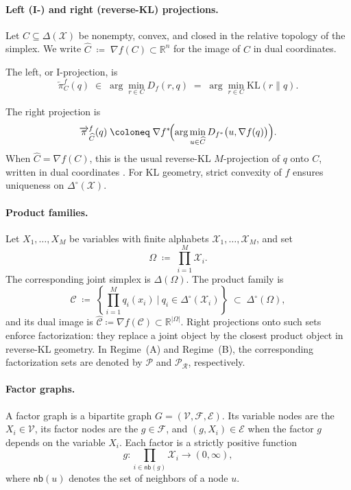 \documentclass[12pt]{article}
\newcommand{\1}{\mathbb{1}}
\newcommand{\defeq}{\coloneq}
\newcommand{\Menge}[2]{\left\{{#1}~\Big|~{#2}\right\}}
\theoremstyle{definition}
\newcommand{\Iproj}{\overleftarrow{\pi}}     %
\newcommand{\Rproj}{\overrightarrow{\pi}}    %
\begin{document}
\paragraph{Left (I-) and right (reverse-KL) projections.}
Let $C\subseteq\Delta(\mathcal{X})$ be nonempty, convex, and
closed in the relative topology of the simplex.
We write $\widehat C \;\defeq\; \nabla f(C)\subset\mathbb R^n$ for the image of $C$ in dual coordinates.

The left, or I-projection, is
\[
\Iproj^f_C(q)
\;\in\;
\arg\min_{r\in C} D_f(r,q)
\;=\;
\arg\min_{r\in C}\mathrm{KL}(r\|q).
\]

The right projection is
\[
\Rproj^f_{\widehat C}(q)
\;\defeq\;
\nabla f^*\!\Bigl(
  \arg\min_{u\in\widehat C} D_{f^*}\bigl(u,\nabla f(q)\bigr)
\Bigr).
\]
When $\widehat C=\nabla f(C)$, this is the usual reverse-KL
$M$-projection of $q$ onto $C$, written in dual coordinates
\cite{csiszar1975idivergence}. For KL geometry, strict convexity of $f$
ensures uniqueness on $\Delta^\circ(\mathcal{X})$.

\paragraph{Product families.}
Let $X_1,\dots,X_M$ be variables with finite alphabets
$\mathcal{X}_1,\dots,\mathcal{X}_M$, and set
\[
\Omega\;\defeq\;\prod_{i=1}^M \mathcal{X}_i.
\]
The corresponding joint simplex is $\Delta(\Omega)$.
The product family is
\[
\mathcal C
\;\defeq\;
\Menge{
  \prod_{i=1}^M q_i(x_i)
}{
  q_i\in\Delta^\circ(\mathcal{X}_i)
}
\;\subset\;
\Delta^\circ(\Omega),
\]
and its dual image is $\widehat{\mathcal C}\defeq \nabla f(\mathcal C)\subset\mathbb R^{|\Omega|}$. Right projections onto such sets enforce factorization:
they replace a joint object by the closest product object in reverse-KL
geometry.
In Regime~(A) and Regime~(B), the corresponding factorization sets are
denoted by $\mathcal P$ and $\mathcal P_{\mathcal R}$, respectively.

\paragraph{Factor graphs.}
A factor graph is a bipartite graph
$G=(\mathcal V,\mathcal F,\mathcal E)$.
Its variable nodes are the $X_i\in\mathcal V$, its factor nodes are the
$g\in\mathcal F$, and $(g,X_i)\in\mathcal E$ when the factor $g$
depends on the variable $X_i$.
Each factor is a strictly positive function
\[
g:\prod_{i\in\mathsf{nb}(g)} \mathcal{X}_i \to (0,\infty),
\]
where $\mathsf{nb}(u)$ denotes the set of neighbors of a node $u$.
\end{document}
